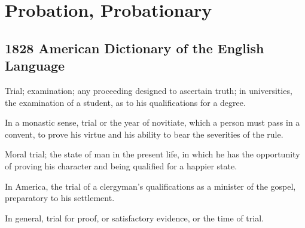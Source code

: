 \section{Probation, Probationary}
	\label{PROBATION}
	

\subsection{1828 American Dictionary of the English Language} %
	\label{PROBATION-1828}

	\begin{compactitem}
		\item[1] Trial; examination; any proceeding designed to ascertain truth; in universities, the examination of a student, as to his qualifications for a degree.
		\item[2] In a monastic sense, trial or the year of novitiate, which a person must pass in a convent, to prove his virtue and his ability to bear the severities of the rule.
		\item[3] Moral trial; the state of man in the present life, in which he has the opportunity of proving his character and being qualified for a happier state.
		\item[4] In America, the trial of a clergyman's qualifications as a minister of the gospel, preparatory to his settlement.
		\item[5] In general, trial for proof, or satisfactory evidence, or the time of trial.
	\end{compactitem}


	
